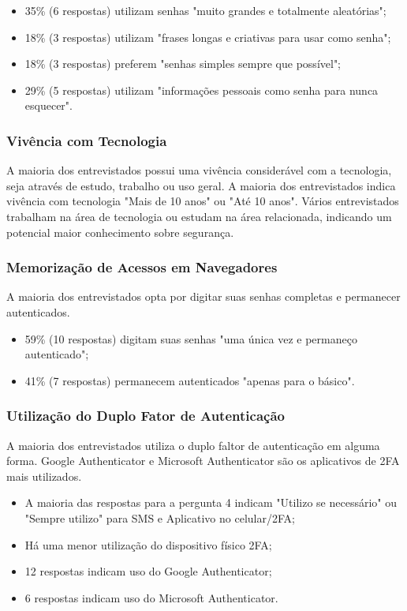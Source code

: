 \documentclass[12pt]{article}
\begin{document}
\begin{itemize}
  \item 35\% (6 respostas) utilizam senhas "muito grandes e totalmente aleatórias";
  \item 18\% (3 respostas) utilizam "frases longas e criativas para usar como senha";
  \item 18\% (3 respostas) preferem "senhas simples sempre que possível";
  \item 29\% (5 respostas) utilizam "informações pessoais como senha para nunca esquecer".
\end{itemize}

\subsubsection{Vivência com Tecnologia}

A maioria dos entrevistados possui uma vivência considerável com a tecnologia, seja
através de estudo, trabalho ou uso geral.
A maioria dos entrevistados indica vivência com tecnologia "Mais de 10 anos" ou "Até
10 anos".
Vários entrevistados trabalham na área de tecnologia ou estudam na área relacionada,
indicando um potencial maior conhecimento sobre segurança.

\subsubsection{Memorização de Acessos em Navegadores}

A maioria dos entrevistados opta por digitar suas senhas completas e permanecer autenticados.

\begin{itemize}
  \item 59\% (10 respostas) digitam suas senhas "uma única vez e permaneço autenticado";
  \item 41\% (7 respostas) permanecem autenticados "apenas para o básico".
\end{itemize}

\subsubsection{Utilização do Duplo Fator de Autenticação}

A maioria dos entrevistados utiliza o duplo faltor de autenticação em alguma forma.
Google Authenticator e Microsoft Authenticator são os aplicativos de 2FA mais utilizados.

\begin{itemize}
  \item A maioria das respostas para a pergunta 4 indicam "Utilizo se necessário" ou
  "Sempre utilizo" para SMS e Aplicativo no celular/2FA;
  \item Há uma menor utilização do dispositivo físico 2FA;
  \item 12 respostas indicam uso do Google Authenticator;
  \item 6 respostas indicam uso do Microsoft Authenticator.
\end{itemize}
\end{document}
